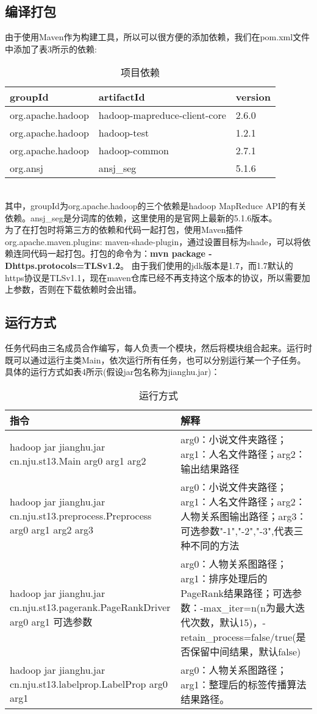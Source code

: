 \subsection{编译打包}
由于使用Maven作为构建工具，所以可以很方便的添加依赖，我们在pom.xml文件中添加了表3所示的依赖:
\begin{table}[!htbp]
	\centering
	\caption{项目依赖}
	\begin{tabular} {|p{90pt}|p{250pt}|p{50pt}|}
		\hline
		groupId& artifactId &version\\
		\hline
		org.apache.hadoop&hadoop-mapreduce-client-core&2.6.0\\
		\hline
		org.apache.hadoop&hadoop-test&1.2.1\\
		\hline
		org.apache.hadoop&hadoop-common&2.7.1\\
		\hline
		org.ansj&ansj\_seg&5.1.6\\
		\hline
	\end{tabular}
\end{table}
\\
其中，groupId为org.apache.hadoop的三个依赖是hadoop MapReduce API的有关依赖。ansj\_seg是分词库的依赖，这里使用的是官网上最新的5.1.6版本。\\
为了在打包时将第三方的依赖和代码一起打包，使用Maven插件org.apache.maven.plugins: maven-shade-plugin，通过设置目标为shade，可以将依赖连同代码一起打包。打包的命令为：\textbf{mvn package -Dhttps.protocols=TLSv1.2}。 由于我们使用的jdk版本是1.7，而1.7默认的https协议是TLSv1.1，现在maven仓库已经不再支持这个版本的协议，所以需要加上参数，否则在下载依赖时会出错。
\subsection{运行方式}
任务代码由三名成员合作编写，每人负责一个模块，然后将模块组合起来。运行时既可以通过运行主类Main，依次运行所有任务，也可以分别运行某一个子任务。具体的运行方式如表4所示(假设jar包名称为jianghu.jar)：
\begin{table}[!htbp]
	\centering
	\caption{运行方式}
	\begin{tabular} {|p{180pt}|p{300pt}|}
		\hline
		指令&解释\\
		\hline
		hadoop jar jianghu.jar cn.nju.st13.Main arg0 arg1 arg2&arg0：小说文件夹路径；arg1：人名文件路径；arg2：输出结果路径\\
		\hline
		hadoop jar  jianghu.jar  cn.nju.st13.preprocess.Preprocess arg0 arg1 arg2 arg3&arg0：小说文件夹路径；arg1：人名文件路径；arg2：人物关系图输出路径；arg3：可选参数"-1","-2","-3",代表三种不同的方法\\
		\hline
		hadoop jar jianghu.jar cn.nju.st13.pagerank.PageRankDriver arg0 arg1 可选参数&arg0：人物关系图路径；arg1：排序处理后的PageRank结果路径；可选参数：-max\_iter=n(n为最大迭代次数，默认15)，-retain\_process=false/true(是否保留中间结果，默认false)\\
		\hline
		hadoop jar jianghu.jar cn.nju.st13.labelprop.LabelProp arg0 arg1&arg0：人物关系图路径；arg1：整理后的标签传播算法结果路径。\\
		\hline
	\end{tabular}
\end{table}

